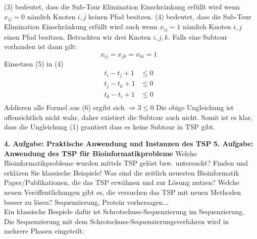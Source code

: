 \documentclass{article}
\begin{document}
\begin{flushleft}
\begin{itemize}
\begin{equation}
    \end{equation}
    (3) bedeutet, dass die Sub-Tour Elimination Einschränkung erfüllt wird wenn $x_{ij} = 0$ nämlich Knoten $i,j$ keinen Pfad besitzen.
    \newline
    (4) bedeutet, dass die Sub-Tour Elimination Einschränkung erfüllt wird auch wenn $x_{ij} = 1$ nämlich Knoten $i,j$ einen Pfad besitzen.
    \newline
    Betrachten wir drei Knoten $i, j, k$. Falls eine Subtour vorhanden ist dann gilt:
    \newline
    \begin{equation}
        x_{ij} = x_{jk} = x_{ki} = 1
    \end{equation}
    Einsetzen (5) in (4)
    \begin{equation}
       \begin{aligned}
           t_i - t_j + 1 &\leq 0 \\
           t_j - t_k + 1 &\leq 0 \\
           t_k - t_i + 1 &\leq 0 \\
       \end{aligned}
    \end{equation}
    \newline
    Addieren alle Formel aus (6) ergibt sich $\Longrightarrow 3 \leq 0$
    \newline
    Die obige Ungleichung ist offensichtlich nicht wahr, daher existiert die Subtour auch nicht.
    Somit ist es klar, dass die Ungleichung (1) grantiert dass es keine Subtour in TSP gibt.
\end{itemize}
\textbf{4. Aufgabe: Praktische Anwendung und Instanzen des TSP}
\newline
\textbf{5. Aufgabe: Anwendung des TSP für Bioinformatikprobleme}
\newline
Welche Bioinformatikprobleme wurden mittels TSP gelöst bzw. untersucht?
Finden und erklären Sie klassische Beispiele!
Was sind die zeitlich neuesten Bioinformatik Paper/Publikationen, die das TSP erwähnen und zur
Lösung nutzen?
Welche neuen Veröffentlichungen gibt es, die versuchen das TSP mit neuen Methoden besser zu
lösen?
\newline
Sequenzierung, Protein vorhersagen...
\newline \\
Ein klassische Bespiele dafür ist Schrotschuss-Sequenzierung im Sequenzierung.
Die Sequenzierung mit dem Schrotschuss-Sequenzierungsverfahren wird in mehrere Phasen eingeteilt:
\begin{itemize}

\end{itemize}
\end{flushleft}
\end{document}
